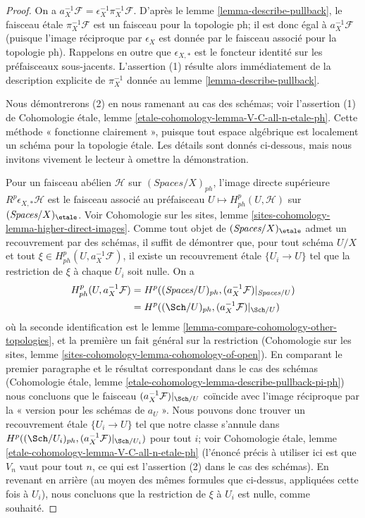 \begin{proof}
On a $a_X^{-1}\mathcal{F} = \epsilon_X^{-1} \pi_X^{-1}\mathcal{F}$.
D'après le lemme \ref{lemma-describe-pullback}, le faisceau étale
$\pi_X^{-1}\mathcal{F}$ est un faisceau pour la topologie ph; il est donc égal
à $a_X^{-1}\mathcal{F}$ (puisque l'image réciproque par $\epsilon_X$ est donnée
par le faisceau associé pour la topologie ph). Rappelons en outre que
$\epsilon_{X, *}$ est le foncteur identité sur les préfaisceaux sous-jacents.
L'assertion (1) résulte alors immédiatement de la description explicite de
$\pi_X^{-1}$ donnée au lemme \ref{lemma-describe-pullback}.

\medskip\noindent
Nous démontrerons (2) en nous ramenant au cas des schémas; voir l'assertion (1)
de Cohomologie étale, lemme
\ref{etale-cohomology-lemma-V-C-all-n-etale-ph}.
Cette méthode « fonctionne clairement », puisque tout espace algébrique est
localement un schéma pour la topologie étale. Les détails sont donnés ci-dessous,
mais nous invitons vivement le lecteur à omettre la démonstration.

\medskip\noindent
Pour un faisceau abélien $\mathcal{H}$ sur $(\textit{Spaces}/X)_{ph}$,
l'image directe supérieure $R^p\epsilon_{X, *}\mathcal{H}$ est le faisceau
associé au préfaisceau $U \mapsto H^p_{ph}(U, \mathcal{H})$
sur $(\textit{Spaces}/X)_\etale$. Voir Cohomologie sur les sites, lemme
\ref{sites-cohomology-lemma-higher-direct-images}.
Comme tout objet de $(\textit{Spaces}/X)_\etale$ admet un recouvrement par des
schémas, il suffit de démontrer que, pour tout schéma $U/X$ et tout
$\xi \in H^p_{ph}(U, a_X^{-1}\mathcal{F})$, il existe un recouvrement étale
$\{U_i \to U\}$ tel que la restriction de $\xi$ à chaque $U_i$ soit nulle.
On a
\begin{align*}
H^p_{ph}(U, a_X^{-1}\mathcal{F})
& =
H^p((\textit{Spaces}/U)_{ph}, (a_X^{-1}\mathcal{F})|_{\textit{Spaces}/U}) \\
& =
H^p((\Sch/U)_{ph}, (a_X^{-1}\mathcal{F})|_{\Sch/U})
\end{align*}
où la seconde identification est le lemme
\ref{lemma-compare-cohomology-other-topologies}, et la première un fait général
sur la restriction (Cohomologie sur les sites, lemme
\ref{sites-cohomology-lemma-cohomology-of-open}).
En comparant le premier paragraphe et le résultat correspondant dans le cas
des schémas (Cohomologie étale, lemme
\ref{etale-cohomology-lemma-describe-pullback-pi-ph})
nous concluons que le faisceau $(a_X^{-1}\mathcal{F})|_{\Sch/U}$
coïncide avec l'image réciproque par la « version pour les schémas de $a_U$ ».
Nous pouvons donc trouver un recouvrement étale $\{U_i \to U\}$ tel que notre
classe s'annule dans
$H^p((\Sch/U_i)_{ph}, (a_X^{-1}\mathcal{F})|_{\Sch/U_i})$
pour tout $i$; voir Cohomologie étale, lemme
\ref{etale-cohomology-lemma-V-C-all-n-etale-ph}
(l'énoncé précis à utiliser ici est que $V_n$ vaut pour tout $n$, ce qui est
l'assertion (2) dans le cas des schémas).
En revenant en arrière (au moyen des mêmes formules que ci-dessus, appliquées
cette fois à $U_i$), nous concluons que la restriction de $\xi$ à $U_i$
est nulle, comme souhaité.
\end{proof}

